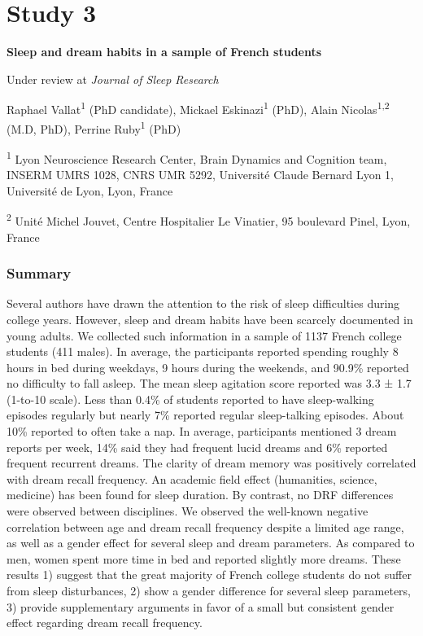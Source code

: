 \cleardoublepage

\chapter{Study 3}
\label{res:survey}

\textbf{{\large Sleep and dream habits in a sample of French students}}

\hfill Under review at \emph{Journal of Sleep Research}

\bigskip

Raphael Vallat\textsuperscript{1} (PhD candidate), Mickael Eskinazi\textsuperscript{1} (PhD), Alain Nicolas\textsuperscript{1,2} (M.D, PhD), Perrine Ruby\textsuperscript{1} (PhD)

\textsuperscript{1} Lyon Neuroscience Research Center, Brain Dynamics and Cognition team, INSERM UMRS 1028, CNRS UMR 5292, Université Claude Bernard Lyon 1, Université de Lyon, Lyon, France

\textsuperscript{2} Unité Michel Jouvet, Centre Hospitalier Le Vinatier, 95 boulevard Pinel, Lyon, France

\subsection*{Summary}
\label{res:survey:summary}

Several authors have drawn the attention to the risk of sleep difficulties during college years. However, sleep and dream habits have been scarcely documented in young adults. We collected such information in a sample of 1137 French college students (411 males). In average, the participants reported spending roughly 8 hours in bed during weekdays, 9 hours during the weekends, and 90.9\% reported no difficulty to fall asleep. The mean sleep agitation score reported was 3.3 ± 1.7 (1-to-10 scale). Less than 0.4\% of students reported to have sleep-walking episodes regularly but nearly 7\% reported regular sleep-talking episodes. About 10\% reported to often take a nap. In average, participants mentioned 3 dream reports per week, 14\% said they had frequent lucid dreams and 6\% reported frequent recurrent dreams. The clarity of dream memory was positively correlated with dream recall frequency. An academic field effect (humanities, science, medicine) has been found for sleep duration. By contrast, no DRF differences were observed between disciplines. We observed the well-known negative correlation between age and dream recall frequency despite a limited age range, as well as a gender effect for several sleep and dream parameters. As compared to men, women spent more time in bed and reported slightly more dreams. These results 1) suggest that the great majority of French college students do not suffer from sleep disturbances, 2) show a gender difference for several sleep parameters, 3) provide supplementary arguments in favor of a small but consistent gender effect regarding dream recall frequency.

